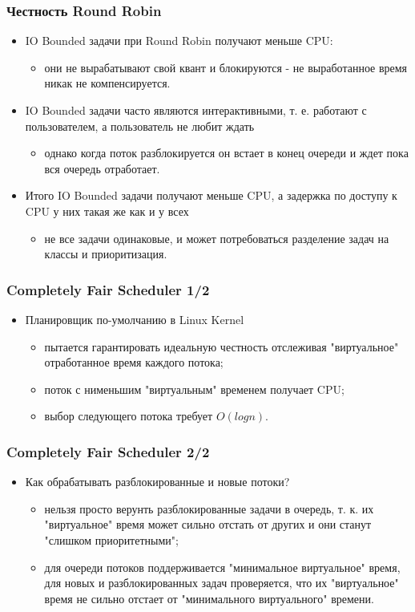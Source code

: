\begin{frame}
\frametitle{Честность Round Robin}
\begin{itemize}
  \item IO Bounded задачи при Round Robin получают меньше CPU:
  \begin{itemize}
    \item они не вырабатывают свой квант и блокируются - не выработанное время
    никак не компенсируется.
  \end{itemize}
  \item IO Bounded задачи часто являются интерактивными, т. е. работают с
  пользователем, а пользователь не любит ждать
  \begin{itemize}
    \item однако когда поток разблокируется он встает в конец очереди и ждет
    пока вся очередь отработает.
  \end{itemize}
  \item Итого IO Bounded задачи получают меньше CPU, а задержка по доступу к CPU
  у них такая же как и у всех
  \begin{itemize}
    \item не все задачи одинаковые, и может потребоваться разделение задач на
    классы и приоритизация.
  \end{itemize}
\end{itemize}
\end{frame}

\begin{frame}
\frametitle{Completely Fair Scheduler 1/2}
\begin{itemize}
  \item Планировщик по-умолчанию в Linux Kernel
  \begin{itemize}
    \item пытается гарантировать идеальную честность отслеживая "виртуальное"
    отработанное время каждого потока;
    \item поток с нименьшим "виртуальным" временем получает CPU;
    \item выбор следующего потока требует $O\left(log n\right)$.
  \end{itemize}
\end{itemize}
\end{frame}

\begin{frame}
\frametitle{Completely Fair Scheduler 2/2}
\begin{itemize}
  \item Как обрабатывать разблокированные и новые потоки?
  \begin{itemize}
    \item нельзя просто верунть разблокированные задачи в очередь, т. к. их
    "виртуальное" время может сильно отстать от других и они станут "слишком
    приоритетными";
    \item для очереди потоков поддерживается "минимальное виртуальное" время,
    для новых и разблокированных задач проверяется, что их "виртуальное" время
    не сильно отстает от "минимального виртуального" времени.
  \end{itemize}
\end{itemize}
\end{frame}

